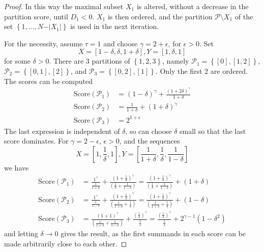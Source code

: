 \documentclass{article}
\theoremstyle{case}
\begin{document}
\begin{proof}
In this way the maximal subset $X_1$ is altered, without a decrease in the partition score, until $D_1 < 0$. $X_1$ is then ordered, and the partition $\mathcal{P} \setminus X_1$ of the set $\left\lbrace 1, \dots, N - \vert X_1\vert\right\rbrace$ is used in the next iteration.

\vspace{16pt}
For the necessity, assume $\tau = 1$ and choose $\gamma = 2 + \epsilon$, for $\epsilon > 0$. Set
\[
X = \left[ 1-\delta, \delta, 1 + \delta\right], Y = \left[ 1, \delta, 1\right]
\] 
for some $\delta > 0$. There are 3 partitions of $\left\lbrace 1, 2, 3\right\rbrace$, namely $\mathcal{P}_1 = \left\lbrace \left[ 0 \right], \left[ 1, 2\right]\right\rbrace$, $\mathcal{P}_2 = \left\lbrace \left[ 0, 1 \right], \left[ 2\right]\right\rbrace$, and $\mathcal{P}_3 = \left\lbrace \left[ 0, 2 \right], \left[ 1 \right]\right\rbrace$. Only the first 2 are ordered. The scores can be computed
\begin{align*}
\text{Score}\left(\mathcal{P}_1\right) & = \left( 1-\delta \right)^\gamma + \frac{\left( 1+2\delta\right)^\gamma}{1+\delta} \\
\text{Score}\left(\mathcal{P}_2\right) & = \frac{1}{1+\delta} + \left( 1+\delta\right)^\gamma \\
\text{Score}\left(\mathcal{P}_3\right) & = 2^{1+\epsilon}
\end{align*}
The last expression is independent of $\delta$, so can choose $\delta$ small so that the last score dominates.
For $\gamma = 2 - \epsilon$, $\epsilon > 0$, and the sequences
\[
X = \left[ 1, \frac{1}{\delta}, 1\right], Y = \left[ \frac{1}{1+\delta}, \frac{1}{\delta}, \frac{1}{1-\delta}\right]
\] 
we have
\begin{align*}
\text{Score}\left(\mathcal{P}_1\right) & = \frac{1^\gamma}{\frac{1}{1+\delta}} + \frac{\left(1 + \frac{1}{\delta}\right)^\gamma}{\left( \frac{1}{\delta} + \frac{1}{1 - \delta}\right) }  = \frac{\left(1 + \frac{1}{\delta}\right)^\gamma}{\left( \frac{1}{\delta} + \frac{1}{1 - \delta}\right) } + \left( 1 + \delta \right)\\
\text{Score}\left(\mathcal{P}_2\right) & = \frac{1^\gamma}{\frac{1}{1-\delta}} + \frac{\left( 1 + \frac{1}{\delta}\right)^\gamma}{\left( \frac{1}{1+\delta} + \frac{1}{\delta}\right)}  = \frac{\left( 1 + \frac{1}{\delta}\right)^\gamma}{\left( \frac{1}{1+\delta} + \frac{1}{\delta}\right)} + \left( 1 - \delta \right)\\
\text{Score}\left(\mathcal{P}_3\right) & = \frac{\left( 1 + 1\right)^\gamma}{\left(\frac{1}{1+\delta} + \frac{1}{1-\delta}\right)}  + \frac{\left( \frac{1}{\delta}\right)^\gamma}{\frac{1}{\delta}} = \frac{\left( \frac{1}{\delta}\right)^\gamma}{\frac{1}{\delta}} + 2^{\gamma - 1}\left( 1 - \delta^2\right) 
\end{align*}
and letting $\delta \rightarrow 0$ gives the result, as the first summands in each score can be made arbitrarily close to each other.


\end{proof}
\end{document}
